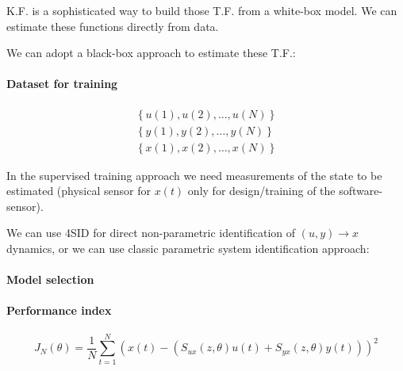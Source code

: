 
K.F. is a sophisticated way to build those T.F. from a white-box model.
We can estimate these functions directly from data.

We can adopt a black-box approach to estimate these T.F.:

\paragraph{Dataset for training}
\begin{align*}
    \left\{ u(1), u(2), \ldots, u(N) \right\} \\
    \left\{ y(1), y(2), \ldots, y(N) \right\} \\
    \left\{ x(1), x(2), \ldots, x(N) \right\}
\end{align*}

In the supervised training approach we need measurements of the state to be estimated (physical sensor for $x(t)$ only for design/training of the software-sensor).

We can use 4SID for direct non-parametric identification of $(u,y)\rightarrow x$ dynamics, or we can use classic parametric system identification approach:

\paragraph{Model selection} \phantom{lol}

\begin{figure}[H]
    \centering
\end{figure}

\paragraph{Performance index}
\[
    J_N(\theta) = \frac{1}{N}\sum_{t=1}^N \left( x(t) - (S_{ux}(z, \theta) u(t) + S_{yx}(z,\theta)y(t)) \right)^2
\]

